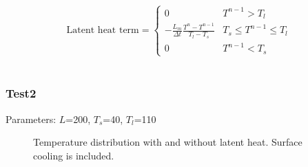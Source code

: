 \documentclass[a4paper,12pt]{article}
\begin{document}
\begin{equation}
\text{Latent heat term}=
\left\{
\begin{array}{cc}
0 & T^{n-1}>T_l \\
-\frac{L_m}{\Delta t}\frac{T^{n}-T^{n-1}}{T_l - T_s} & T_s \leq T^{n-1} \leq T_l \\
0 & T^{n-1} < T_s
\end{array}
\right.
\end{equation}
\\
\subsubsection{Test2}
Parameters: $L$=200, $T_s$=40, $T_l$=110\\

\begin{figure}[!ht]
     \hfill
     \caption{Temperature distribution with and without latent heat. Surface cooling is included.}
     \label{fig:temp}
   \end{figure}
\end{document}
